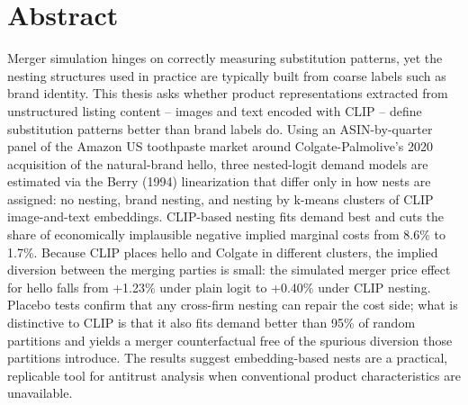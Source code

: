 \documentclass[a4paper,titlepage,liststotoc,final,oneside,openany,BCOR12mm,fontsize=12pt]{scrreprt}
\begin{document}
\newpage
\thispagestyle{empty}
\section*{Abstract}
Merger simulation hinges on correctly measuring substitution patterns, yet the
nesting structures used in practice are typically built from coarse labels such
as brand identity. This thesis asks whether product representations extracted
from unstructured listing content -- images and text encoded with CLIP -- define
substitution patterns better than brand labels do. Using an ASIN-by-quarter
panel of the Amazon US toothpaste market around Colgate-Palmolive's 2020
acquisition of the natural-brand hello, three nested-logit demand models are
estimated via the Berry (1994) linearization that differ only in how nests are
assigned: no nesting, brand nesting, and nesting by k-means clusters of CLIP
image-and-text embeddings. CLIP-based nesting fits demand best and cuts the
share of economically implausible negative implied marginal costs from 8.6\% to
1.7\%. Because CLIP places hello and Colgate in different clusters, the implied
diversion between the merging parties is small: the simulated merger price
effect for hello falls from +1.23\% under plain logit to +0.40\% under CLIP
nesting. Placebo tests confirm that any cross-firm nesting can repair the cost
side; what is distinctive to CLIP is that it also fits demand better than
95\% of random partitions and yields a merger counterfactual free of the
spurious diversion those partitions introduce. The results suggest
embedding-based nests are a practical, replicable tool for antitrust analysis
when conventional product characteristics are unavailable.
\end{document}
